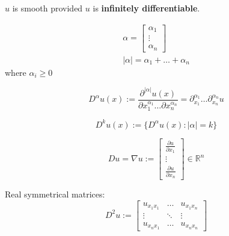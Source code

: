 \documentclass{article}
\begin{document}
\begin{definition}[smooth]
    $u$ is smooth provided $u$ is \textbf{infinitely differentiable}.
\end{definition}

\begin{definition}
    \begin{gather}
        \label{eq:alpha}
        \alpha = \begin{bmatrix} \alpha_{1} \\ \vdots \\ \alpha_{n} \end{bmatrix} \\
        \label{eq:|alpha|}
        |\alpha| = \alpha_{1} + \ldots + \alpha_{n}
    \end{gather}
    where $\alpha_{i} \geq 0$
\end{definition}

\begin{definition}[$D^{\alpha}$]
    \begin{equation}
        \label{eq:D-alpha}
        D^{\alpha} u(x) := \frac{\partial^{|\alpha|} u(x)}{\partial x_{1}^{\alpha_{1}} \ldots \partial x_{n}^{\alpha_{n}}}
        = \partial_{x_{1}}^{\alpha_{1}} \ldots \partial_{x_{n}}^{\alpha_{n}} u
    \end{equation}
\end{definition}

\begin{definition}[$D^{k}$]
    \begin{equation}
        \label{eq:Dk}
        D^{k} u(x) := \{D^{\alpha} u(x) : |\alpha| = k\}
    \end{equation}
\end{definition}

\begin{definition}
    \begin{equation}
        \label{eq:D}
        Du = \nabla u :=
        \begin{bmatrix}
            \frac{\partial u}{\partial x_{1}} \\
            \vdots                            \\
            \frac{\partial u}{\partial x_{n}}
        \end{bmatrix}
        \in \mathbb{R}^{n}
    \end{equation}
\end{definition}

\begin{definition}
    Real symmetrical matrices:
    \begin{equation}
        \label{eq:D2}
        D^{2}u :=
        \begin{bmatrix}
            u_{x_{1}x_{1}} & \dots  & u_{x_{1}x_{n}} \\
            \vdots         & \ddots & \vdots         \\
            u_{x_{n}x_{1}} & \dots  & u_{x_{n}x_{n}}
        \end{bmatrix}
    \end{equation}
\end{definition}
\end{document}
